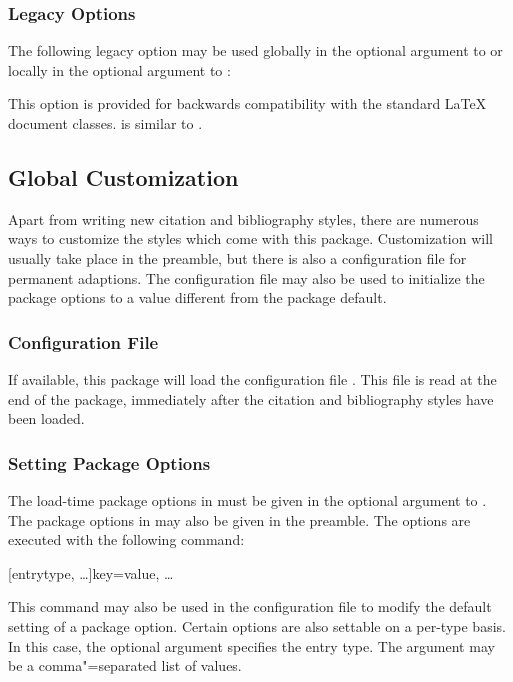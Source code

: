 \documentclass{ltxdockit}[2011/03/25]
\begin{document}
\subsubsection{Legacy Options}

The following legacy option may be used globally in the optional argument to  or locally in the optional argument to :

\begin{optionlist}

\DeprecatedMark  This option is provided for backwards compatibility with the standard LaTeX document classes.  is similar to .

\end{optionlist}

\subsection{Global Customization}
\label{use:cfg}

Apart from writing new citation and bibliography styles, there are numerous ways to customize the styles which come with this package. Customization will usually take place in the preamble, but there is also a configuration file for permanent adaptions. The configuration file may also be used to initialize the package options to a value different from the package default.

\subsubsection{Configuration File}
\label{use:cfg:cfg}

If available, this package will load the configuration file . This file is read at the end of the package, immediately after the citation and bibliography styles have been loaded.

\subsubsection{Setting Package Options}
\label{use:cfg:opt}

The load-time package options in  must be given in the optional argument to . The package options in  may also be given in the preamble. The options are executed with the following command:

\begin{ltxsyntax}

[entrytype, \dots]{key=value, \dots}

This command may also be used in the configuration file to modify the default setting of a package option. Certain options are also settable on a per-type basis. In this case, the optional  argument specifies the entry type. The  argument may be a comma"=separated list of values.

\end{ltxsyntax}
\end{document}
